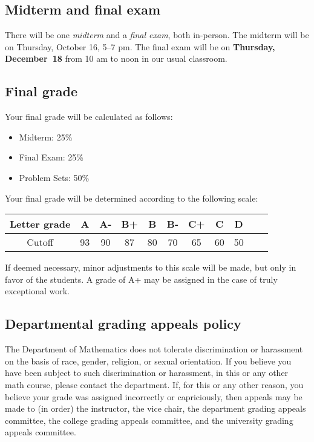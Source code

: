 \documentclass[12pt]{amsart}
\begin{document}
\subsection*{Midterm and final exam} There will be one {\it midterm} and a {\it final exam}, both in-person. The midterm will be on Thursday, October 16, 5--7 pm.
The final exam will be on 
{\bf Thursday, December~18} from 10 am to noon in our usual classroom.



\subsection*{Final grade} Your final grade will be calculated as follows:

\begin{itemize}

	\item Midterm: 25\%
	\item Final Exam: 25\%
	\item Problem Sets: 50\%
\end{itemize}

\noindent
Your final grade will be determined according to the following scale:

\begin{center}
\hspace{2em}
\begin{minipage}{0.75\textwidth}
	\begin{tabular}{|c||c|c|c|c|c|c|c|c|c|c|}
	\hline
	Letter grade & A & A- & B+ & B & B- & C+ & C & D \\
	\hline
	Cutoff & 93 & 90 & 87 & 80 & 70 & 65 & 60 & 50 \\
	\hline
\end{tabular}
\end{minipage}
\end{center}

\noindent
If deemed necessary, minor adjustments to this scale will be made, but only in favor of the students. A grade of A+ may be assigned in the case of truly exceptional work.

\subsection*{Departmental grading appeals policy} 
The Department of Mathematics does not tolerate discrimination or harassment on the basis of race, gender, religion, or sexual orientation. If you believe you have been subject to such discrimination or harassment, in this or any other math course, please contact the department. If, for this or any other reason, you believe your grade was assigned incorrectly or capriciously, then appeals may be made to (in order) the instructor, the vice chair, the department grading appeals committee, the college grading appeals committee, and the university grading appeals committee.
\end{document}
